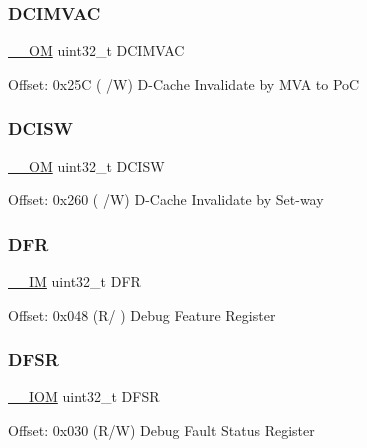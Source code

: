 \subsubsection{\texorpdfstring{D\+C\+I\+M\+V\+AC}{DCIMVAC}}
{\footnotesize\ttfamily \mbox{\hyperlink{core__cm4_8h_a0ea2009ed8fd9ef35b48708280fdb758}{\+\_\+\+\_\+\+OM}} uint32\+\_\+t D\+C\+I\+M\+V\+AC}

Offset\+: 0x25C ( /W) D-\/\+Cache Invalidate by M\+VA to PoC \mbox{\label{struct_s_c_b___type_aca1ec746911b0934dd11c31d93a369be}} 
\subsubsection{\texorpdfstring{D\+C\+I\+SW}{DCISW}}
{\footnotesize\ttfamily \mbox{\hyperlink{core__cm4_8h_a0ea2009ed8fd9ef35b48708280fdb758}{\+\_\+\+\_\+\+OM}} uint32\+\_\+t D\+C\+I\+SW}

Offset\+: 0x260 ( /W) D-\/\+Cache Invalidate by Set-\/way \mbox{\label{struct_s_c_b___type_ae2b3d4530d1b0c05593b634dc46348bd}} 
\subsubsection{\texorpdfstring{D\+FR}{DFR}}
{\footnotesize\ttfamily \mbox{\hyperlink{core__cm4_8h_a4cc1649793116d7c2d8afce7a4ffce43}{\+\_\+\+\_\+\+IM}} uint32\+\_\+t D\+FR}

Offset\+: 0x048 (R/ ) Debug Feature Register \mbox{\label{struct_s_c_b___type_a3b590075aa07880ce686d5cfb4e61c5c}} 
\subsubsection{\texorpdfstring{D\+F\+SR}{DFSR}}
{\footnotesize\ttfamily \mbox{\hyperlink{core__cm4_8h_ab6caba5853a60a17e8e04499b52bf691}{\+\_\+\+\_\+\+I\+OM}} uint32\+\_\+t D\+F\+SR}

Offset\+: 0x030 (R/W) Debug Fault Status Register \mbox{\label{struct_s_c_b___type_ad5a9c8098433fa3ac108487e0ccd9cfc}} 
